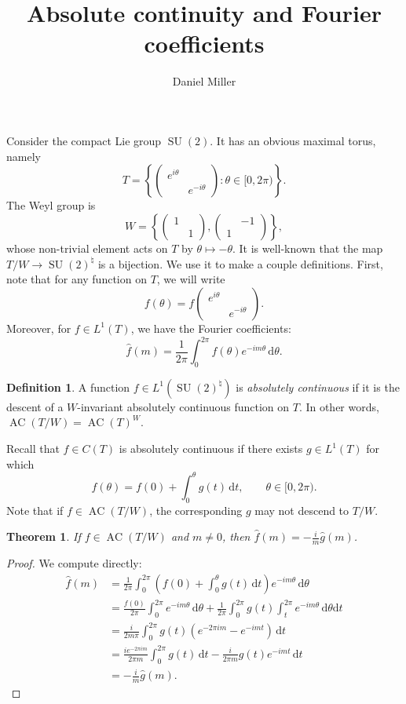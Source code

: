 \documentclass{article}
\title{Absolute continuity and Fourier coefficients}
\author{Daniel Miller}
\DeclareMathOperator{\AC}{AC}
\DeclareMathOperator{\SU}{SU}
\newcommand{\dd}{\mathrm{d}}
\newtheorem{theorem}{Theorem}
\theoremstyle{definition}
\newtheorem{definition}{Definition}
\begin{document}
\maketitle





Consider the compact Lie group $\SU(2)$. It has an obvious maximal torus, 
namely 
\[
	T = \left\{\begin{pmatrix} e^{i\theta} \\ & e^{-i\theta}\end{pmatrix} : \theta\in [0,2\pi)\right\} .
\]
The Weyl group is 
\[
	W = \left\{\begin{pmatrix} 1 \\ & 1 \end{pmatrix}, \begin{pmatrix} & -1 \\ 1 \end{pmatrix}\right\} ,
\]
whose non-trivial element acts on $T$ by $\theta\mapsto -\theta$. It is 
well-known that the map $T/W \to \SU(2)^\natural$ is a bijection. We use it to 
make a couple definitions. First, note that for any function on $T$, we will 
write 
\[
	f(\theta) = f\begin{pmatrix} e^{i\theta} \\ & e^{-i\theta} \end{pmatrix} .
\]
Moreover, for $f\in L^1(T)$, we have the Fourier coefficients:
\[
	\widehat f(m) = \frac{1}{2\pi} \int_0^{2\pi} f(\theta) e^{-i m \theta}\, \dd \theta .
\]

\begin{definition}
A function $f\in L^1(\SU(2)^\natural)$ is \emph{absolutely continuous} if it is 
the descent of a $W$-invariant absolutely continuous function on $T$. In 
other words, $\AC(T/W) = \AC(T)^W$. 
\end{definition}

Recall that $f\in C(T)$ is absolutely continuous if there exists $g\in L^1(T)$ 
for which 
\[
	f(\theta) = f(0) + \int_0^\theta g(t)\, \dd t, \qquad \theta\in [0,2\pi) .
\]
Note that if $f\in \AC(T/W)$, the corresponding $g$ may not descend to 
$T/W$. 

\begin{theorem}
If $f\in \AC(T/W)$ and $m\ne 0$, then 
$\widehat f(m) = -\frac{i}{m} \widehat g(m)$. 
\end{theorem}
\begin{proof}
We compute directly:
\begin{align*}
	\widehat f(m) 
		&= \frac{1}{2\pi} \int_0^{2\pi} \left(f(0) + \int_0^\theta g(t)\, \dd t\right) e^{-i m \theta}\, \dd \theta \\
		&= \frac{f(0)}{2\pi} \int_0^{2\pi} e^{-i m \theta}\, \dd\theta + \frac{1}{2\pi} \int_0^{2\pi} g(t)\int_t^{2\pi} e^{-i m \theta} \,\dd\theta\dd t \\
		&= \frac{i}{2m\pi} \int_0^{2\pi} g(t) (e^{-2\pi i m} - e^{-i m t})\, \dd t \\
		&= \frac{i e^{-2\pi i m}}{2\pi m}\int_0^{2\pi} g(t)\, \dd t - \frac{i}{2\pi m} g(t) e^{-i m t}\, \dd t \\
		&= -\frac{i}{m} \widehat g(m) .
\end{align*}
\end{proof}
\end{document}

